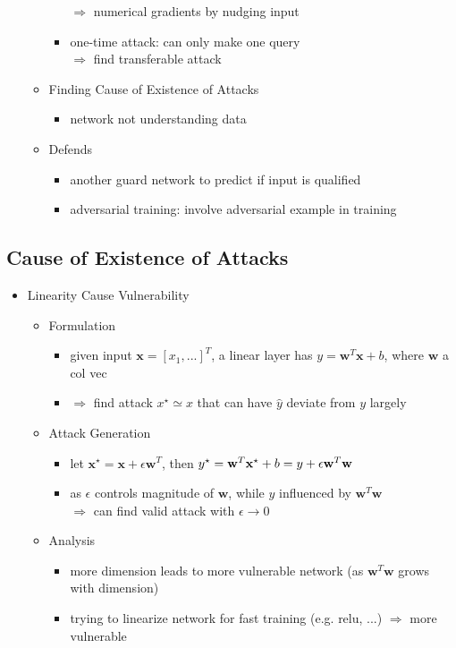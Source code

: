 \begin{itemize}
\begin{itemize}
\begin{itemize}
		$\Rightarrow$ numerical gradients by nudging input
		\item one-time attack: can only make one query \\
		$\Rightarrow$ find transferable attack
		\end{itemize}
	\item Finding Cause of Existence of Attacks
		\begin{itemize}
		\item network not understanding data
		\end{itemize}
	\item Defends
		\begin{itemize}
		\item another guard network to predict if input is qualified
		\item adversarial training: involve adversarial example in training
		\end{itemize}
	\end{itemize}
\end{itemize}
\subsection{Cause of Existence of Attacks}
\begin{itemize}
\item Linearity Cause Vulnerability
	\begin{itemize}
	\item Formulation
		\begin{itemize}
		\item given input $\mathbf x=[x_1,...]^T$, a linear layer has $y=\mathbf w^T \mathbf x +b$, where $\mathbf w$ a col vec
		\item $\Rightarrow$ find attack $x^\star \simeq x$ that can have $\hat y$ deviate from $y$ largely
		\end{itemize}
	\item Attack Generation
		\begin{itemize}
		\item let $\mathbf x^\star=\mathbf x+\epsilon\mathbf w^T$, then $y^\star=\mathbf \mathbf \mathbf w^T \mathbf x^\star + b = y+ \epsilon\mathbf w^T\mathbf w$
		\item as $\epsilon$ controls magnitude of $\mathbf w$, while $y$ influenced by $\mathbf w^T \mathbf w$\\
		$\Rightarrow$ can find valid attack with $\epsilon\rightarrow 0$
		\end{itemize}
	\item Analysis
		\begin{itemize}
		\item more dimension leads to more vulnerable network (as $\mathbf w^T\mathbf w$ grows with dimension)
		\item trying to linearize network for fast training (e.g. relu, ...) $\Rightarrow$ more vulnerable
		\end{itemize}
	\end{itemize}
\end{itemize}


